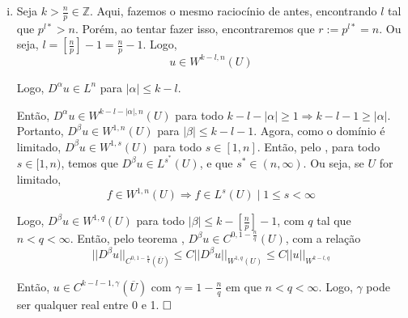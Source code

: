 \documentclass[a4paper, 11pt]{book}
\newcommand{\qed}{$\hfill\square$}
\newcommand{\Z}{\mathbb{Z}}
\begin{document}
\begin{enumerate}[(i)]
	Então, aplicando o  em toda $D^\beta u$ com $|\beta|\leq k-l-1$, temos que $D^\beta u \in C^{0, 1 - \frac{n}{r}}(\overline{U})$, já que $r>n$. Outra interpretação é pensar que se a derivada fraca de uma função é contínua, a função é contínua.
	
	
	
	
	Logo, temos que \[ u \in C^{k-l-1, 1 - \frac{n}{r}}(\overline{U}) \]
	
	Agora, para simplificar, vemos que $ 1-\frac{n}{r} = 1 - \frac{n}{p} + l = \left[\frac{n}{p}\right] + 1 - \frac{n}{p}$ e que $ k-l-1 = k - \left[\frac{n}{p}\right] - 1$. Então, \[ u \in C^{k-\left[\frac{n}{p}\right]-1, \gamma}(\overline{U}) \] para $\gamma = \left[\frac{n}{p}\right] + 1 - \frac{n}{p}$, que é 1 menos a parte decimal de $n/p$.
	
	Para a estimativa da norma, sendo $\gamma = 1 - \frac{n}{r}$,
	\begin{align*}
		||u^*||_{C^{0,\gamma}(\overline{U})} &\leq C ||u||_{W^{1,r}(U)}  \leq C ||u||_{W^{k,p}(U)}\\
		\vdots & \leq \vdots \\
		||D^\beta u^*||_{C^{0,\gamma}(\overline{U})} &\leq C ||D^\beta u||_{W^{1,r}(U)} \leq C ||u||_{W^{k,p}(U)}
	\end{align*}

	Pela definição da norma de Hölder (soma das normas de Hölder para as derivadas). Então, ao somar as desigualdades acima, encontramos
	\[ ||u||_{C^{k-\left[\frac{n}{p}\right]-1, \gamma}(\overline{U})} \leq C ||u||_{W^{k,p}(U)} \]\qed
	
	
	
	\item Seja $k>\frac{n}{p} \in \Z$. Aqui, fazemos o mesmo raciocínio de antes, encontrando $l$ tal que $p^{l*}>n$. Porém, ao tentar fazer isso, encontraremos que $r:= p^{l*}=n$. Ou seja, $l = \left[\frac{n}{p}\right]-1 = \frac{n}{p}-1$. Logo, \[ u \in W^{k-l,n}(U) \]

	Logo, $D^\alpha u \in L^n$ para $|\alpha|\leq k-l$.
	
	Então, $ D^\alpha u \in W^{k-l-|\alpha|,n}(U) $ para todo $k-l-|\alpha|\geq1 \Rightarrow k-l-1 \geq |\alpha|$. Portanto, $D^\beta u \in W^{1,n}(U)$ para $|\beta| \leq k-l-1$. Agora, como o domínio é limitado, $D^\beta u \in W^{1,s}(U)$ para todo $s \in [1,n]$. Então, pelo , para todo $s \in [1,n)$, temos que $D^\beta u \in L^{s^*}(U)$, e que $s^* \in (n, \infty)$. Ou seja, se $U$ for limitado, \[f \in W^{1,n}(U) \Rightarrow f \in L^s(U) \mid 1 \leq s < \infty\]
	
	Logo, $D^\beta u \in W^{1,q}(U)$ para todo $|\beta| \leq k - \left[\frac{n}{p}\right] - 1$, com $q$ tal que $n<q<\infty$. Então, pelo teorema , $D^\beta u \in C^{0,1 - \frac{n}{q}}(U)$, com a relação \[ ||D^\beta u||_{C^{0,1 - \frac{n}{q}}(\overline{U})} \leq C ||D^\beta u||_{W^{1,q}(U)} \leq C ||u||_{W^{k-l,q}} \]
	
	Então, $ u \in C^{k-l-1,\gamma}(\overline{U}) $ com $\gamma = 1 - \frac{n}{q}$ em que $n < q < \infty$. Logo, $\gamma$ pode ser qualquer real entre 0 e 1. \qed
	
	
\end{enumerate}
\end{document}
